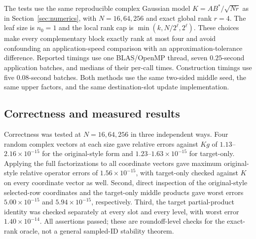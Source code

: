 \documentclass[11pt]{article}
\begin{document}
The tests use the same reproducible complex Gaussian model $K=AB^*/\sqrt{Nr}$ as in Section~\ref{sec:numerics}, with $N=16,64,256$ and exact global rank $r=4$.  The leaf size is $n_0=1$ and the local rank cap is $\min(k,N/2^{\ell},2^{\ell})$.  These choices make every complementary block exactly rank at most four and avoid confounding an application-speed comparison with an approximation-tolerance difference.  Reported timings use one BLAS/OpenMP thread, seven $0.25$-second application batches, and medians of their per-call times.  Construction timings use five $0.08$-second batches.  Both methods use the same two-sided middle seed, the same upper factors, and the same destination-slot update implementation.

\begin{center}
\end{center}

\subsection{Correctness and measured results}

Correctness was tested at $N=16,64,256$ in three independent ways.  Four random complex vectors at each size gave relative errors against $Kg$ of $1.13$--$2.16\times10^{-15}$ for the original-style form and $1.23$--$1.63\times10^{-15}$ for target-only.  Applying the full factorizations to all coordinate vectors gave maximum original-style relative operator errors of $1.56\times10^{-15}$, with target-only checked against $K$ on every coordinate vector as well.  Second, direct inspection of the original-style selected-row coordinates and the target-only middle products gave worst errors $5.00\times10^{-15}$ and $5.94\times10^{-15}$, respectively.  Third, the target partial-product identity was checked separately at every slot and every level, with worst error $1.40\times10^{-14}$.  All assertions passed; these are roundoff-level checks for the exact-rank oracle, not a general sampled-ID stability theorem.
\end{document}
